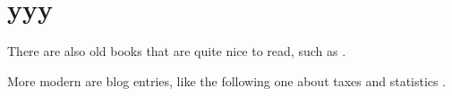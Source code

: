\section{yyy}


There are also old books that are quite nice to read, such as \cite{Achieser1981}.

More modern are blog entries, like the following one about taxes and statistics \cite{Hesse20140306}.

\blindtext 
